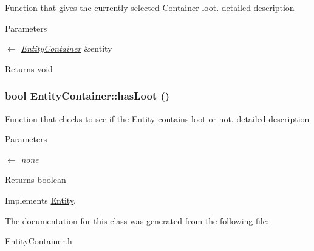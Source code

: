 Function that gives the currently selected Container loot. detailed description 
\begin{DoxyParams}{Parameters}
\item[\mbox{$\leftarrow$} {\em \hyperlink{classEntityContainer}{EntityContainer}}]\&entity \end{DoxyParams}
\begin{DoxyReturn}{Returns}
void 
\end{DoxyReturn}
\hypertarget{classEntityContainer_aa6dc3c46009f7647eb68a8d8d005f94a}{
\subsubsection[{hasLoot}]{\setlength{\rightskip}{0pt plus 5cm}bool EntityContainer::hasLoot ()}}
\label{classEntityContainer_aa6dc3c46009f7647eb68a8d8d005f94a}


Function that checks to see if the \hyperlink{classEntity}{Entity} contains loot or not. detailed description 
\begin{DoxyParams}{Parameters}
\item[\mbox{$\leftarrow$} {\em none}]\end{DoxyParams}
\begin{DoxyReturn}{Returns}
boolean 
\end{DoxyReturn}


Implements \hyperlink{classEntity_aaac21381e4a788de507e706ce8d188c1}{Entity}.

The documentation for this class was generated from the following file:\begin{DoxyCompactItemize}
\item 
EntityContainer.h\end{DoxyCompactItemize}
